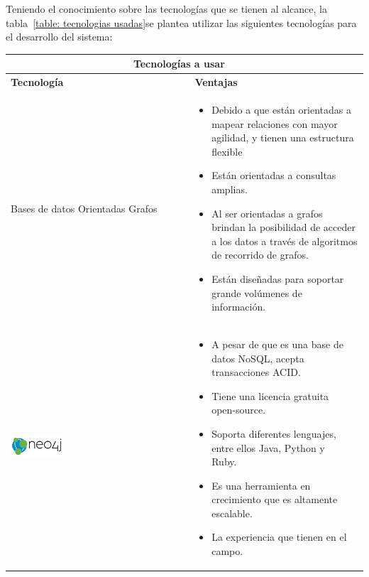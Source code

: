 \clearpage
    \newpage
    Teniendo el conocimiento sobre las tecnologías que se tienen al alcance, la tabla~\ref{table: tecnologias usadas}se plantea utilizar las siguientes tecnologías para el desarrollo del sistema:
    \begin{table}[b!]
    \centering
    \vspace{33mm}
      \begin{tabular}{|p{2cm}|ll}
        \hline
        \multicolumn{2}{|c|}{{\bf Tecnologías a usar}} \\ 
        \hline
          \multicolumn{1}{|p{4cm}|}{{\bf Tecnología}} & 
		  \multicolumn{1}{p{10cm}|}{{\bf Ventajas}}\\
        \hline
          \multicolumn{1}{|p{5cm}|}{Bases de datos Orientadas  Grafos} & 
          \multicolumn{2}{p{10cm}|}{\begin{itemize}
          \vspace{-5mm}
         \item Debido a que están orientadas a mapear relaciones con mayor agilidad, y tienen una estructura flexible
         \item Están orientadas a consultas amplias. 
         \item Al ser orientadas a grafos brindan la posibilidad de acceder a los datos a través de algoritmos de recorrido de grafos.
         \item Están diseñadas para soportar grande volúmenes de información.
      \end{itemize}} \\
        \hline
          \multicolumn{1}{|p{5cm}|}{\includegraphics[width=0.3\textwidth]{images/neo4j}} & 
          \multicolumn{1}{p{10cm}|}{
          \begin{itemize}
          \vspace{-15mm}
       \item A pesar de que es una base de datos NoSQL, acepta transacciones ACID.
       \item Tiene una licencia gratuita open-source.
       \item Soporta diferentes lenguajes, entre ellos Java, Python y Ruby.
       \item Es una herramienta en crecimiento que es altamente escalable.
       \item La experiencia que tienen en el campo.
      \end{itemize}} \\ 
       
        \hline
      \end{tabular}
    \end{table}
